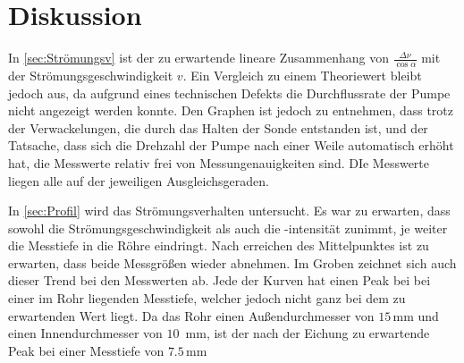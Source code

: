 \section{Diskussion}
\label{sec:Diskussion}

In \autoref{sec:Strömungsv} ist der zu erwartende lineare Zusammenhang von $\frac{\Delta \nu}{\cos \alpha}$ mit der Strömungsgeschwindigkeit $v$. Ein Vergleich zu einem Theoriewert bleibt jedoch aus, 
da aufgrund eines technischen Defekts die Durchflussrate der Pumpe nicht angezeigt werden konnte. Den Graphen ist jedoch zu entnehmen, dass trotz der Verwackelungen, die durch das Halten der Sonde entstanden ist, und 
der Tatsache, dass sich die Drehzahl der Pumpe nach einer Weile automatisch erhöht hat, die Messwerte relativ frei von Messungenauigkeiten sind. DIe Messwerte liegen alle auf der jeweiligen Ausgleichsgeraden.

In \autoref{sec:Profil} wird das Strömungsverhalten untersucht. Es war zu erwarten, dass sowohl die Strömungsgeschwindigkeit als auch die -intensität zunimmt, je weiter die Messtiefe in die Röhre eindringt.
Nach erreichen des Mittelpunktes ist zu erwarten, dass beide Messgrößen wieder abnehmen. Im Groben zeichnet sich auch dieser Trend bei den Messwerten ab. Jede der Kurven hat einen Peak bei bei einer im Rohr liegenden Messtiefe, welcher jedoch nicht ganz bei dem zu erwartenden Wert liegt.
Da das Rohr einen Außendurchmesser von $15\,$mm und einen Innendurchmesser von $10\,$ mm, ist der nach der Eichung zu erwartende Peak bei einer Messtiefe von $7.5\,$mm
